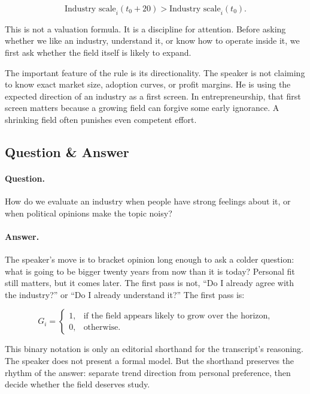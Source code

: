 \begin{equation}
\text{Industry scale}_i(t_0+20) >
\text{Industry scale}_i(t_0).
\end{equation}

This is not a valuation formula. It is a discipline for attention. Before asking whether we like an industry, understand it, or know how to operate inside it, we first ask whether the field itself is likely to expand.

The important feature of the rule is its directionality. The speaker is not claiming to know exact market size, adoption curves, or profit margins. He is using the expected direction of an industry as a first screen. In entrepreneurship, that first screen matters because a growing field can forgive some early ignorance. A shrinking field often punishes even competent effort.

\subsection{Question \& Answer}

\paragraph{Question.}
How do we evaluate an industry when people have strong feelings about it, or when political opinions make the topic noisy?

\paragraph{Answer.}
The speaker's move is to bracket opinion long enough to ask a colder question: what is going to be bigger twenty years from now than it is today? Personal fit still matters, but it comes later. The first pass is not, ``Do I already agree with the industry?'' or ``Do I already understand it?'' The first pass is:

\begin{equation}
G_i =
\begin{cases}
1, & \text{if the field appears likely to grow over the horizon},\\
0, & \text{otherwise}.
\end{cases}
\end{equation}

This binary notation is only an editorial shorthand for the transcript's reasoning. The speaker does not present a formal model. But the shorthand preserves the rhythm of the answer: separate trend direction from personal preference, then decide whether the field deserves study.

